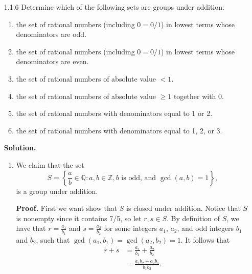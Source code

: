 \documentclass[9pt]{article}
\newcommand{\Z}{\mathbb{Z}}
\newcommand{\Q}{\mathbb{Q}}
\begin{document}
\begin{enumerate}
   \item[1.1.6]   Determine which of the following sets are groups under
                  addition:
                  \begin{enumerate}
                     \item the set of rational numbers (including $0 = 0/1$) in
                           lowest terms whose denominators are odd.
                     \item the set of rational numbers (including $0 = 0/1$) in
                           lowest terms whose denominators are even.
                     \item the set of rational numbers of absolute value $< 1$.
                     \item the set of rational numbers of absolute value $\ge 1$
                           together with 0.
                     \item the set of rational numbers with denominators equal
                           to 1 or 2.
                     \item the set of rational numbers with denominators equal
                           to 1, 2, or 3.
                  \end{enumerate}

      \textbf{Solution.}

      \begin{enumerate}
         \item We claim that the set
               $$S = \left\{\frac{a}{b} \in \Q : a, b \in \Z, b \text{ is odd,} 
                        \text{ and } \gcd(a, b) = 1\right\},$$
               is a group under addition.

               \textbf{Proof.} First we want show that $S$ is closed under 
               addition. Notice that $S$ is nonempty since it contains 7/5, so
               let $r, s \in S$. By definition of $S$, we have that
               $r = \frac{a_1}{b_1}$ and $s = \frac{a_2}{b_2}$ for some
               integers $a_1$, $a_2$, and odd integers $b_1$ and $b_2$, such
               that $\gcd(a_1, b_1) = \gcd(a_2, b_2) = 1$. It follows that
               \begin{align*}
                  r + s &= \frac{a_1}{b_1} + \frac{a_2}{b_2} \\
                        &= \frac{a_1b_2 + a_2b_1}{b_1b_2}.
               \end{align*}


\end{enumerate}
\end{enumerate}
\end{document}
